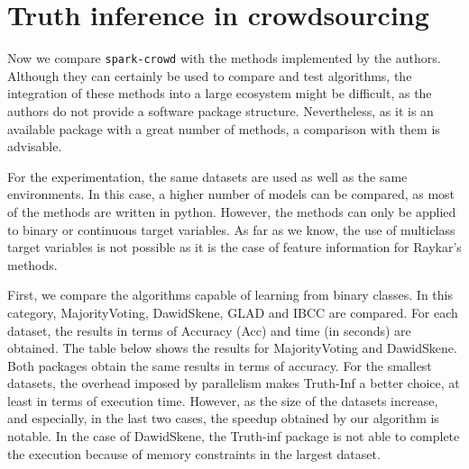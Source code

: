 \documentclass[letterpaper,10pt,english]{sphinxmanual}
\begin{document}
\section{Truth inference in crowdsourcing}
\label{\detokenize{package/other:id2}}
Now we compare \texttt{spark-crowd} with the methods implemented by the authors. Although they
can certainly be used to compare and test algorithms, the integration of these
methods into a large ecosystem might be difficult, as the authors do not provide
a software package structure. Nevertheless, as it is an available package with a great number
of methods, a comparison with them is advisable. 

For the experimentation, the same datasets are used as well as the same environments. 
In this case, a higher number of models can be compared, as most of the methods are written in python. 
However, the methods can only be applied to binary or continuous target variables. As far as we
know, the use of multiclass target variables is not possible as it is the case of feature information for
Raykar's methods. 

First, we compare the algorithms capable of learning from binary classes.
In this category, MajorityVoting, DawidSkene, GLAD and IBCC are compared. For each dataset, the  
results in terms of Accuracy (Acc) and time (in seconds) are obtained. The table below shows the results for
MajorityVoting and DawidSkene. Both packages obtain the same results in terms of
accuracy. For the smallest datasets, the overhead imposed by parallelism makes Truth-Inf a better choice,
at least in terms of execution time. However, as the size of the datasets increase, and especially, in the last two
cases, the speedup obtained by our algorithm is notable. In the case of DawidSkene, the Truth-inf
package is not able to complete the execution because of memory constraints in the largest dataset.
\end{document}
